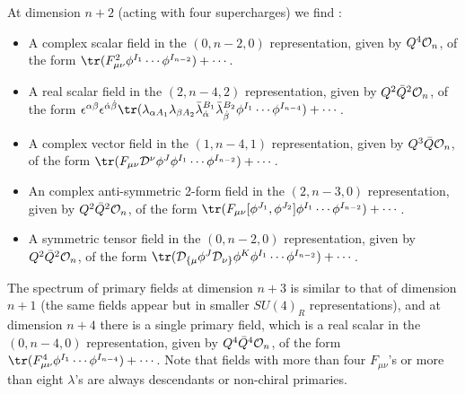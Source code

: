 At dimension $n+2$ (acting with four supercharges) we find :
\begin{itemize}
\item{} A complex scalar field in the $(0,n-2,0)$ representation,
given by $Q^4 {\cal O}_n$, of the form $\tr(F_{\mu \nu}^2 \phi^{I_1}
\cdots \phi^{I_{n-2}}) + \cdots$.
\item{} A real scalar field in the $(2,n-4,2)$ representation, given
by $Q^2 {\bar Q}^2 {\cal O}_n$, of the form $\epsilon^{\alpha \beta}
\epsilon^{\dot{\alpha} \dot{\beta}} \tr(\lambda_{\alpha A_1}
\lambda_{\beta A_2} {\bar \lambda}_{\dot{\alpha}}^{B_1} {\bar
\lambda}_{\dot{\beta}}^{B_2} \phi^{I_1} \cdots \phi^{I_{n-4}}) +
\cdots$.
\item{} A complex vector field in the $(1,n-4,1)$ representation,
given by $Q^3 {\bar Q} {\cal O}_n$, of the form $\tr(F_{\mu \nu} {\cal
D}^\nu \phi^{J} \phi^{I_1} \cdots \phi^{I_{n-2}}) + \cdots$.
\item{} An complex anti-symmetric 2-form field in the $(2,n-3,0)$
representation, given by $Q^2 {\bar Q}^2 {\cal O}_n$, of the form
$\tr(F_{\mu \nu} [\phi^{J_1},\phi^{J_2}] \phi^{I_1} \cdots
\phi^{I_{n-2}}) + \cdots$.
\item{} A symmetric tensor field in the $(0,n-2,0)$ representation,
given by $Q^2 {\bar Q}^2 {\cal O}_n$, of the form $\tr({\cal D}_{\{\mu}
\phi^J {\cal D}_{\nu\}} \phi^K \phi^{I_1} \cdots \phi^{I_{n-2}}) + \cdots$.
\end{itemize}

The spectrum of primary fields at dimension $n+3$ is similar to that
of dimension $n+1$ (the same fields appear but in smaller $SU(4)_R$
representations), and at dimension $n+4$ there is a single primary
field, which is a real scalar in the $(0,n-4,0)$ representation, given
by $Q^4 {\bar Q}^4 {\cal O}_n$, of the form $\tr(F_{\mu \nu}^4
\phi^{I_1} \cdots \phi^{I_{n-4}}) + \cdots$. Note that fields with
more than four $F_{\mu \nu}$'s or more than eight $\lambda$'s are
always descendants or non-chiral primaries. 

